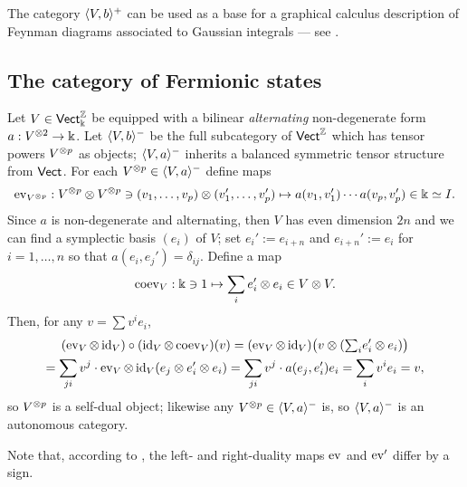 The category $\btpc{V,b}$ can be used as a base for a graphical
calculus description of Feynman diagrams associated to Gaussian
integrals --- see \cite[sec.\
2.8]{murri-fiorenza;feynman}.


\subsection{The category of Fermionic states}
\label{sec:fermionic}

Let $V \in \catVect[\fk]^\setZ$ be equipped with a bilinear \emph{alternating}
non-degenerate form $a: V\tp{2} \to \fk$. Let $\ftpc{V,b}$ be the full
subcategory of $\catVect^\setZ$ which has tensor powers $V\tp{p}$ as
objects; $\ftpc{V,a}$ inherits a balanced symmetric tensor structure
from $\catVect$. For each $V\tp{p} \in \ftpc{V,a}$ define maps
\begin{equation*}
  \ev_{V\tp{p}}: V\tp{p} \otimes V\tp{p} \ni (v_1, \ldots, v_p) \otimes (v'_1, \ldots, v'_p) \mapsto
  a(v_1, v'_1) \cdots a(v_p, v'_p) \in \fk \simeq I.
\end{equation*}
Since $a$ is non-degenerate and alternating, then $V$ has even
dimension $2n$ and we can find a symplectic basis $(e_i)$  of
$V$; set $e_i' := e_{i+n}$  and $e_{i+n}' := e_i$ for $i = 1, \ldots, n$
so that $a(e_i, e_j')= \delta_{ij}$. Define a map
\begin{equation*}
  \coev_V : \fk \ni 1 \mapsto \sum_i e_i' \otimes e_i \in V \otimes V.
\end{equation*}
Then, for any $v = \sum v^i e_i$,
\begin{multline*}
  (\ev_V \otimes \id_V) \circ (\id_V \otimes \coev_V) (v) 
  = (\ev_V \otimes \id_V) \bigl(v \otimes ( {\textstyle \sum_i} e_i' \otimes e_i) \bigr)
  \\
  = \sum_{ji} v^j \cdot \ev_V \otimes \id_V (e_j \otimes e_i' \otimes e_i)
  = \sum_{ji} v^j \cdot a(e_j, e_i') e_i
  = \sum_i v^i e_i = v  ,
\end{multline*}
so $V\tp{p}$ is a self-dual object; likewise any $V\tp{p} \in
\ftpc{V,a}$ is, so $\ftpc{V,a}$ is an autonomous category.

Note that, according to , the left- and
right-duality maps $\ev$ and $\ev'$ differ by a sign.



